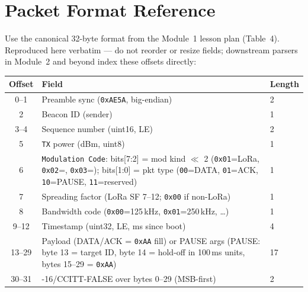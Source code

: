 \documentclass[11pt,letterpaper]{article}
\begin{document}
\section{Packet Format Reference}
Use the canonical 32-byte format from the Module~1 lesson plan (Table~4). Reproduced here verbatim --- do not reorder or resize fields; downstream parsers in Module~2 and beyond index these offsets directly:
\begin{table}[h!]
	\centering
	\begin{tabular}{c p{11cm} l}
		\toprule
		\textbf{Offset} & \textbf{Field} & \textbf{Length} \\
		\midrule
		0--1 & Preamble sync (\texttt{0xAE5A}, big-endian) & 2 \\
		2 & Beacon ID (sender) & 1 \\
		3--4 & Sequence number (uint16, \mbox{LE}) & 2 \\
		5 & \texttt{TX} power (dBm, uint8) & 1 \\
		6 & \texttt{Modulation Code}: bits[7:2] = mod kind $\ll$ 2 (\texttt{0x01}=LoRa, \texttt{0x02}=\FSK{}, \texttt{0x03}=\OOK{}); bits[1:0] = pkt type (\texttt{00}=DATA, \texttt{01}=ACK, \texttt{10}=PAUSE, \texttt{11}=reserved) & 1 \\
		7 & Spreading factor (LoRa SF 7--12; \texttt{0x00} if non-LoRa) & 1 \\
		8 & Bandwidth code (\texttt{0x00}=125\,kHz, \texttt{0x01}=250\,kHz, \dots) & 1 \\
		9--12 & Timestamp (uint32, \mbox{LE}, ms since boot) & 4 \\
		13--29 & Payload (DATA/ACK = \texttt{0xAA} fill) or PAUSE args (PAUSE: byte 13 = target ID, byte 14 = hold-off in 100\,ms units, bytes 15--29 = \texttt{0xAA}) & 17 \\
		30--31 & \CRC{}-16/CCITT-FALSE over bytes 0--29 (MSB-first) & 2 \\
		\bottomrule
	\end{tabular}
\end{table}

\newpage
\end{document}
